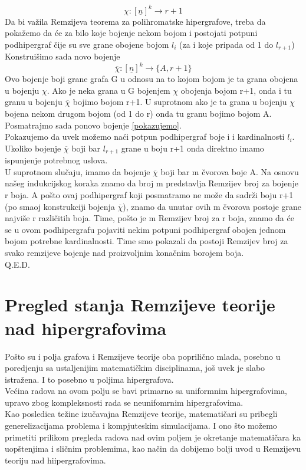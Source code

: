 \documentclass[a4paper]{article}
\begin{document}
\begin{description}
		\begin{equation}\label{pokazujemo}
		\chi : [\underline{n}]^k \rightarrow r+1
		\end{equation}
		Da bi važila Remzijeva teorema za polihromatske hipergrafove, treba da pokažemo da će za bilo koje bojenje nekom bojom i postojati potpuni podhipergraf čije su sve grane obojene bojom $l_i$ (za i koje pripada od 1 do $l_{r+1}$) %
		Konstruišimo sada novo bojenje 
		\begin{equation}
			\overline{\chi} : [\underline{n}]^k \rightarrow \{A, r+1\}
		\end{equation}
		Ovo bojenje  boji grane grafa G u odnosu na to kojom bojom je ta grana obojena u bojenju $\chi$. Ako je neka grana u G bojenjem $\chi$ obojenja bojom r+1, onda i tu granu u bojenju $\overline{\chi}$ bojimo bojom r+1. U suprotnom ako je ta grana u bojenju $\chi$ bojena nekom drugom bojom (od 1 do r) onda tu granu bojimo bojom A.\\
		Posmatrajmo sada ponovo bojenje \ref{pokazujemo}.\\
		Pokazujemo da uvek možemo naći potpun podhipergraf boje i i kardinalnosti $l_i$.
		Ukoliko bojenje $\overline{\chi}$ boji bar $l_{r+1}$ grane u boju r+1 onda direktno imamo ispunjenje potrebnog uslova.
		\\
		U suprotnom slučaju, imamo da bojenje $\overline{\chi}$ boji bar m čvorova boje A. Na osnovu našeg indukcijskog koraka znamo da broj m predstavlja Remzijev broj za bojenje r boja. A pošto ovaj podhipergraf koji posmatramo ne može da sadrži boju r+1 (po smaoj konstrukciji bojenja $\overline{\chi}$), znamo da unutar ovih m čvorova postoje grane najviše r različitih boja. Time, pošto je m Remzijev broj za r boja, znamo da će se u ovom podhipergrafu pojaviti nekim potpuni podhipergraf obojen jednom bojom potrebne kardinalnosti. Time smo pokazali da postoji Remzijev broj za svako remzijeve bojenje nad proizvoljnim konačnim borojem boja. \\
		Q.E.D.
 	\end{description}
	\section{Pregled stanja Remzijeve teorije nad hipergrafovima}
	Pošto su i polja grafova i Remzijeve teorije oba poprilično mlada, posebno u poredjenju sa ustaljenijim matematičkim disciplinama, još uvek je slabo istražena. I to posebno u poljima hipergrafova.\\ Većina radova na ovom polju se bavi primarno sa uniformnim hipergrafovima, upravo zbog kompleksnosti rada se neunifomrnim hipergrafovima.\\ Kao posledica težine izučavajna Remzijeve teorije, matematičari su pribegli generelizacijama problema i kompjuteskim simulacijama. I ono što možemo primetiti prilikom pregleda radova nad ovim poljem je okretanje matematičara ka uopštenjima i sličnim problemima, kao način da dobijemo bolji uvod u Remzijevu teoriju nad hiipergrafovima.
\end{document}
